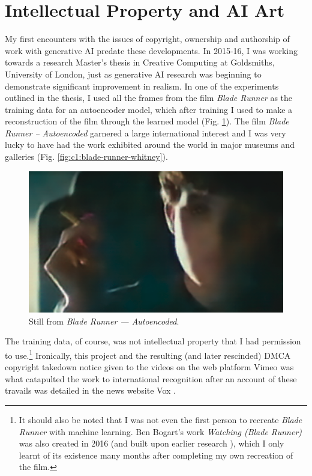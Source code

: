 \section{Intellectual Property and AI Art}

My first encounters with the issues of copyright, ownership and authorship of work with generative AI predate these developments. 
In 2015-16, I was working towards a research Master's thesis in Creative Computing at Goldsmiths, University of London, just as generative AI research was beginning to demonstrate significant improvement in realism. 
In one of the experiments outlined in the thesis, I used all the frames from the film \textit{Blade Runner} as the training data for an autoencoder model, which after training I used to make a reconstruction of the film through the learned model \citep{broad2016autoencoding}  (Fig. \ref{fig:c1:blade-runner}).
The film \textit{Blade Runner -- Autoencoded} garnered a large international interest and I was very lucky to have had the work exhibited around the world in major museums and galleries \citep{broad2017autoencoding}  (Fig. \ref{fig:c1:blade-runner-whitney}).

\begin{figure}[!htb]
    \centering
    \captionsetup{justification=centering}
    \includegraphics[width=1\textwidth]{figures/c1_intro/blade_runner_still.png}
    \caption{Still from \textit{Blade Runner --- Autoencoded}.}
    \label{fig:c1:blade-runner}
\end{figure}

The training data, of course, was not intellectual property that I had permission to use.\footnote{It should also be noted that I was not even the first person to recreate \textit{Blade Runner} with machine learning. Ben Bogart's work \textit{Watching (Blade Runner)} was also created in 2016 \citep{bogart2016watching} (and built upon earlier research \citep{bogart2008memory,bogart2013context}), which I only learnt of its existence many months after completing my own recreation of the film.}
Ironically, this project and the resulting (and later rescinded) DMCA copyright takedown notice given to the videos on the web platform Vimeo was what catapulted the work to international recognition after an account of these travails was detailed in the news website Vox \citep{romano2016bladerunner}.

